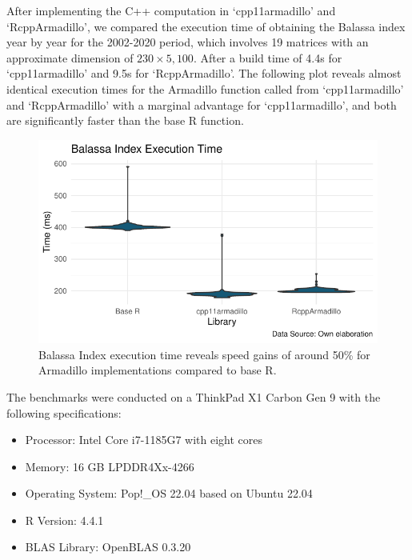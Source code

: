 \documentclass[preprint,12pt]{elsarticle}
\providecommand{\tightlist}{%
  \setlength{\itemsep}{0pt}\setlength{\parskip}{0pt}}
\begin{document}
After implementing the C++ computation in `cpp11armadillo' and
`RcppArmadillo', we compared the execution time of obtaining the Balassa
index year by year for the 2002-2020 period, which involves 19 matrices
with an approximate dimension of \(230 \times 5,100\). After a build
time of 4.4s for `cpp11armadillo' and 9.5s for `RcppArmadillo'. The
following plot reveals almost identical execution times for the
Armadillo function called from `cpp11armadillo' and `RcppArmadillo' with
a marginal advantage for `cpp11armadillo', and both are significantly
faster than the base R function.

\begin{figure}[H]

{\centering \includegraphics{cpp11armadillo_files/figure-pdf/benchmark-1.pdf}

}

\caption{Balassa Index execution time reveals speed gains of around 50\%
for Armadillo implementations compared to base R.}

\end{figure}%

\newpage

The benchmarks were conducted on a ThinkPad X1 Carbon Gen 9 with the
following specifications:

\begin{itemize}
\tightlist
\item
  Processor: Intel Core i7-1185G7 with eight cores
\item
  Memory: 16 GB LPDDR4Xx-4266
\item
  Operating System: Pop!\_OS 22.04 based on Ubuntu 22.04
\item
  R Version: 4.4.1
\item
  BLAS Library: OpenBLAS 0.3.20
\end{itemize}
\end{document}
